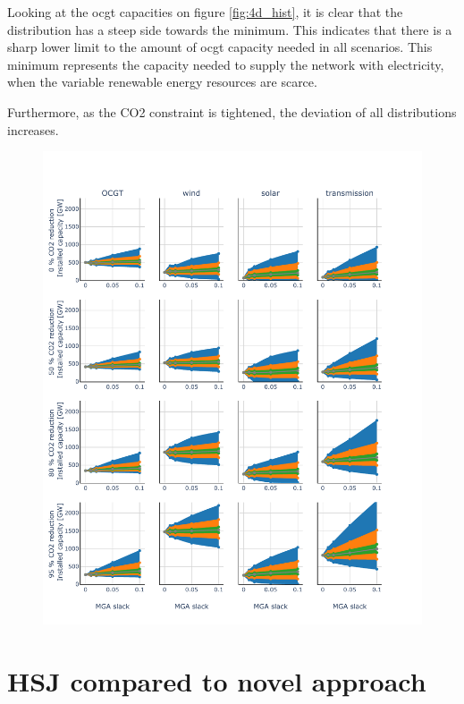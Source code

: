 Looking at the ocgt capacities on figure \ref{fig:4d_hist}, it is clear that the distribution has a steep side towards the minimum. This indicates that there is a sharp lower limit to the amount of ocgt capacity needed in all scenarios. This minimum represents the capacity needed to supply the network with electricity, when the variable renewable energy resources are scarce. 

Furthermore, as the CO2 constraint is tightened, the deviation of all distributions increases. 


\begin{figure}[H]\centering
	\includegraphics[width=1.\textwidth]{./Images/Capacaty_vs_cost}
	\caption{}
	\label{fig:cap_vs_cost}
\end{figure}



\section{HSJ compared to novel approach}